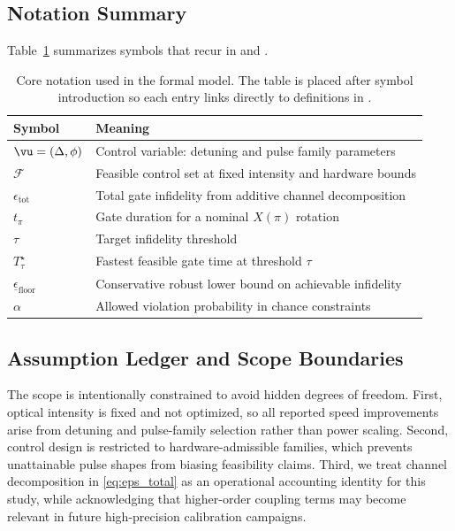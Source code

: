 \documentclass{article} %
\begin{document}
\subsection{Notation Summary}
Table~\ref{tab:notation} summarizes symbols that recur in  and .

\begin{table}[t]
\caption{Core notation used in the formal model. The table is placed after symbol introduction so each entry links directly to definitions in .}
\label{tab:notation}
\centering
\small
\renewcommand{\arraystretch}{1.1}
\setlength{\tabcolsep}{4pt}
\begin{tabular}{ll}
\hline
Symbol & Meaning \\
\hline
$\vu=(\Delta,\phi)$ & Control variable: detuning and pulse family parameters \\
$\mathcal{F}$ & Feasible control set at fixed intensity and hardware bounds \\
$\epsilon_{\mathrm{tot}}$ & Total gate infidelity from additive channel decomposition \\
$t_{\pi}$ & Gate duration for a nominal $X(\pi)$ rotation \\
$\tau$ & Target infidelity threshold \\
$T_{\tau}^{\star}$ & Fastest feasible gate time at threshold $\tau$ \\
$\underline{\epsilon}_{\mathrm{floor}}$ & Conservative robust lower bound on achievable infidelity \\
$\alpha$ & Allowed violation probability in chance constraints \\
\hline
\end{tabular}
\end{table}

\subsection{Assumption Ledger and Scope Boundaries}
The scope is intentionally constrained to avoid hidden degrees of freedom. First, optical intensity is fixed and not optimized, so all reported speed improvements arise from detuning and pulse-family selection rather than power scaling. Second, control design is restricted to hardware-admissible families, which prevents unattainable pulse shapes from biasing feasibility claims. Third, we treat channel decomposition in \eqref{eq:eps_total} as an operational accounting identity for this study, while acknowledging that higher-order coupling terms may become relevant in future high-precision calibration campaigns.
\end{document}
